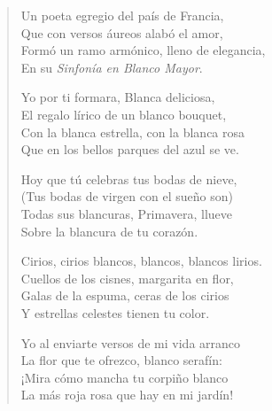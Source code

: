 \documentclass[12pt]{article}
\begin{document}
\clearpage
{}
\begin{verse}

Un poeta egregio del país de Francia,\\
Que con versos áureos alabó el amor,\\
Formó un ramo armónico, lleno de elegancia,\\
En su \emph{Sinfonía en Blanco Mayor}.  

Yo por ti formara, Blanca deliciosa,\\
El regalo lírico de un blanco bouquet,\\
Con la blanca estrella, con la blanca rosa\\
Que en los bellos parques del azul se ve.  

Hoy que tú celebras tus bodas de nieve,\\
(Tus bodas de virgen con el sueño son)\\
Todas sus blancuras, Primavera, llueve\\
Sobre la blancura de tu corazón.  

Cirios, cirios blancos, blancos, blancos lirios.\\
Cuellos de los cisnes, margarita en flor,\\
Galas de la espuma, ceras de los cirios\\
Y estrellas celestes tienen tu color.  

Yo al enviarte versos de mi vida arranco\\
La flor que te ofrezco, blanco serafín:\\
¡Mira cómo mancha tu corpiño blanco\\
La más roja rosa que hay en mi jardín!  

\end{verse}
\end{document}
